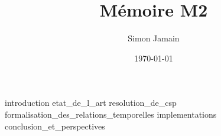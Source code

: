 \documentclass{report}
\title{Mémoire M2}
\author{Simon Jamain}
\date{\today}
\begin{document}
\maketitle

\tableofcontents

{introduction}
{etat_de_l_art}
{resolution_de_csp}
{formalisation_des_relations_temporelles}
{implementations}
{conclusion_et_perspectives}

%
%

\printbibliography
\end{document}
